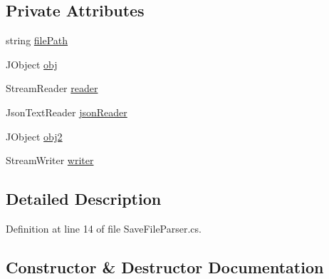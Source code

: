\subsection*{Private Attributes}
\begin{DoxyCompactItemize}
\item 
string \hyperlink{class_c_p_u___o_s___simulator_1_1_save___file___editor_1_1_save_file_parser_a72ee7515830d28ee38f7948be3bc36f8}{file\+Path}
\item 
J\+Object \hyperlink{class_c_p_u___o_s___simulator_1_1_save___file___editor_1_1_save_file_parser_a2538a13b548479f69ecfbfbbd7a6352d}{obj}
\item 
Stream\+Reader \hyperlink{class_c_p_u___o_s___simulator_1_1_save___file___editor_1_1_save_file_parser_afaaae9bacbb6b3e6bb60e6f2cf56b8fd}{reader}
\item 
Json\+Text\+Reader \hyperlink{class_c_p_u___o_s___simulator_1_1_save___file___editor_1_1_save_file_parser_a2bec0a18f532b3cfdd9aa3099f649f73}{json\+Reader}
\item 
J\+Object \hyperlink{class_c_p_u___o_s___simulator_1_1_save___file___editor_1_1_save_file_parser_af573707eb50c2153f2875df7978ef651}{obj2}
\item 
Stream\+Writer \hyperlink{class_c_p_u___o_s___simulator_1_1_save___file___editor_1_1_save_file_parser_ae55f5ab4843419903f5131ba85342bce}{writer}
\end{DoxyCompactItemize}


\subsection{Detailed Description}


Definition at line 14 of file Save\+File\+Parser.\+cs.



\subsection{Constructor \& Destructor Documentation}
\hypertarget{class_c_p_u___o_s___simulator_1_1_save___file___editor_1_1_save_file_parser_a65aa87bc19585e2000605ceb988c2c8b}{}
